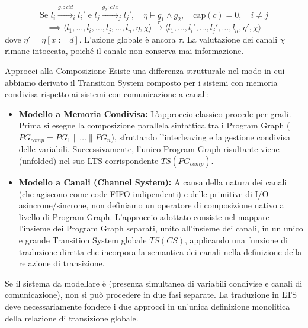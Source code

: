 \begin{itemize}
        \[ \text{Se } l_i \xrightarrow{g_1:c!d}_i l_i' \text{ e } l_j \xrightarrow{g_2:c?x}_j l_j', \quad \eta \models g_1 \land g_2, \quad \text{cap}(c) = 0, \quad i \neq j \]
        \[ \implies \langle l_1, \dots, l_i, \dots, l_j, \dots, l_n, \eta, \chi \rangle \xrightarrow{\tau} \langle l_1, \dots, l_i', \dots, l_j', \dots, l_n, \eta', \chi \rangle \]
        dove \(\eta' = \eta[x := d]\). L'azione globale è ancora \(\tau\). La valutazione dei canali \(\chi\) rimane intoccata, poiché il canale non conserva mai informazione.
\end{itemize}

\begin{observation}{Approcci alla Composizione}
  Esiste una differenza strutturale nel modo in cui abbiamo derivato il Transition System composto per i sistemi con memoria condivisa rispetto ai sistemi con comunicazione a canali:
  \begin{itemize}
    \item \textbf{Modello a Memoria Condivisa:} L'approccio classico procede per gradi. Prima si esegue la composizione parallela sintattica tra i Program Graph (\(PG_{comp} = PG_1 \parallel \dots \parallel PG_n\)), sfruttando l'interleaving e la gestione condivisa delle variabili. Successivamente, l'unico Program Graph risultante viene  (unfolded) nel suo LTS corrispondente \(TS(PG_{comp})\).
    \item \textbf{Modello a Canali (Channel System):} A causa della natura dei canali (che agiscono come code FIFO indipendenti) e delle primitive di I/O asincrone/sincrone, non definiamo un operatore di composizione nativo a livello di Program Graph. L'approccio adottato consiste nel mappare  l'insieme dei Program Graph separati, unito all'insieme dei canali, in un unico e grande Transition System globale \(TS(CS)\), applicando una funzione di traduzione diretta che incorpora la semantica dei canali nella definizione della relazione di transizione.
  \end{itemize}
  Se il sistema da modellare è  (presenza simultanea di variabili condivise e canali di comunicazione), non si può procedere in due fasi separate. La traduzione in LTS deve necessariamente fondere i due approcci in un'unica definizione monolitica della relazione di transizione globale.
\end{observation}